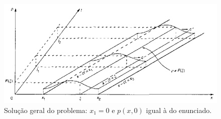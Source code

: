 \begin{figure}[H]
    \centering
    \includegraphics[width = 0.8\linewidth]{img/applied-dif-equ/plot3d.png}
    \caption{Solução geral do problema: $x_1 = 0$ e $p(x,0)$ igual à do enunciado.}
    \label{fig:3dplot}
\end{figure}


